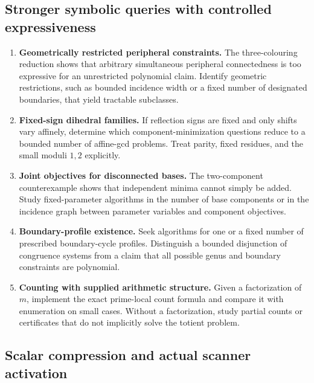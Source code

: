 \subsection{Stronger symbolic queries with controlled expressiveness}

\begin{enumerate}[resume]
\item \textbf{Geometrically restricted peripheral constraints.} The
three-colouring reduction shows that arbitrary simultaneous peripheral
connectedness is too expressive for an unrestricted polynomial claim.
Identify geometric restrictions, such as bounded incidence width or a
fixed number of designated boundaries, that yield tractable subclasses.
\item \textbf{Fixed-sign dihedral families.} If reflection signs are fixed
and only shifts vary affinely, determine which component-minimization
questions reduce to a bounded number of affine-gcd problems. Treat
parity, fixed residues, and the small moduli $1,2$ explicitly.
\item \textbf{Joint objectives for disconnected bases.} The two-component
counterexample shows that independent minima cannot simply be added.
Study fixed-parameter algorithms in the number of base components or in
the incidence graph between parameter variables and component objectives.
\item \textbf{Boundary-profile existence.} Seek algorithms for one or a
fixed number of prescribed boundary-cycle profiles. Distinguish a
bounded disjunction of congruence systems from a claim that all possible
genus and boundary constraints are polynomial.
\item \textbf{Counting with supplied arithmetic structure.} Given a
factorization of $m$, implement the exact prime-local count formula and
compare it with enumeration on small cases. Without a factorization,
study partial counts or certificates that do not implicitly solve the
totient problem.
\end{enumerate}

\subsection{Scalar compression and actual scanner activation}

